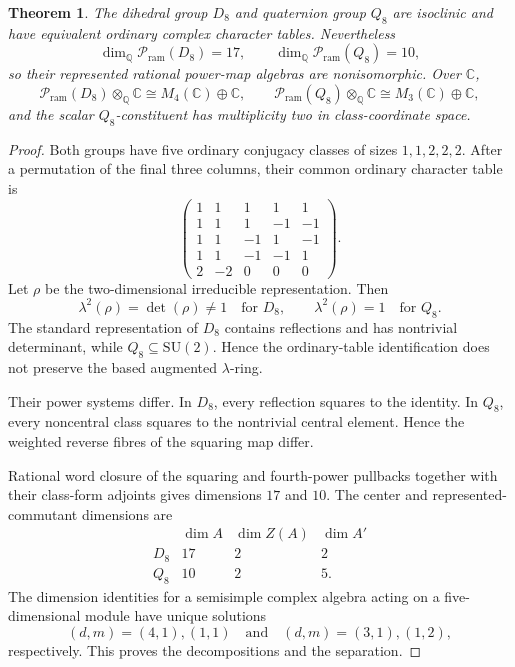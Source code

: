 \documentclass[11pt,reqno]{amsart}
\numberwithin{equation}{section}
\newtheorem{theorem}{Theorem}[section]
\theoremstyle{remark}
\theoremstyle{plain}
\newcommand{\Q}{\mathbb Q}
\newcommand{\C}{\mathbb C}
\newcommand{\Pram}{\mathcal P_{\mathrm{ram}}}
\newcommand{\1}{\mathbf 1}
\begin{document}
\begin{theorem}
\label{thm:d8-q8}
The dihedral group \(D_8\) and quaternion group \(Q_8\) are isoclinic and
have equivalent ordinary complex character tables.  Nevertheless
\[
 \dim_{\Q}\Pram(D_8)=17,\qquad
 \dim_{\Q}\Pram(Q_8)=10,
\]
so their represented rational power-map algebras are nonisomorphic.  Over
\(\C\),
\[
 \Pram(D_8)\otimes_{\Q}\C
 \cong M_4(\C)\oplus\C,
\qquad
 \Pram(Q_8)\otimes_{\Q}\C
 \cong M_3(\C)\oplus\C,
\]
and the scalar \(Q_8\)-constituent has multiplicity two in class-coordinate
space.
\end{theorem}

\begin{proof}
Both groups have five ordinary conjugacy classes of sizes
\(1,1,2,2,2\).  After a permutation of the final three columns, their
common ordinary character table is
\[
\begin{pmatrix}
1& 1& 1& 1& 1\\
1& 1& 1&-1&-1\\
1& 1&-1& 1&-1\\
1& 1&-1&-1& 1\\
2&-2& 0& 0& 0
\end{pmatrix}.
\]
Let \(\rho\) be the two-dimensional irreducible representation.  Then
\[
 \lambda^2(\rho)=\det(\rho)\neq1\quad\text{for }D_8,
 \qquad
 \lambda^2(\rho)=1\quad\text{for }Q_8.
\]
The standard representation of \(D_8\) contains reflections and has
nontrivial determinant, while \(Q_8\subseteq\mathrm{SU}(2)\).  Hence the
ordinary-table identification does not preserve the based augmented
\(\lambda\)-ring.

Their power systems differ.  In \(D_8\), every reflection squares to the
identity.  In \(Q_8\), every noncentral class squares to the nontrivial
central element.  Hence the weighted reverse fibres of the squaring map
differ.

Rational word closure of the squaring and fourth-power pullbacks
together with their class-form adjoints gives dimensions \(17\) and \(10\).
The center and represented-commutant dimensions are
\[
\begin{array}{c|ccc}
 &\dim A&\dim Z(A)&\dim A'\\
\hline
D_8&17&2&2\\
Q_8&10&2&5.
\end{array}
\]
The dimension identities for a semisimple complex algebra acting on a
five-dimensional module have unique solutions
\[
 (d,m)=(4,1),(1,1)
 \quad\text{and}\quad
 (d,m)=(3,1),(1,2),
\]
respectively.  This proves the decompositions and the separation.
\end{proof}
\end{document}
